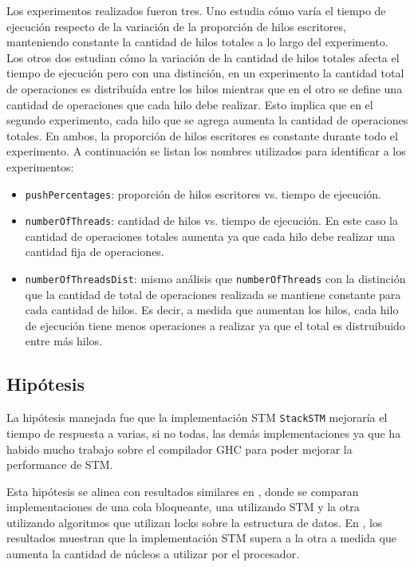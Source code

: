 Los experimentos realizados fueron tres.
Uno estudia cómo varía el tiempo de ejecución respecto de la variación de la proporción de hilos escritores, manteniendo constante la cantidad de hilos totales a lo largo del experimento.
Los otros dos estudian cómo la variación de la cantidad de hilos totales afecta el tiempo de ejecución pero con una distinción, en un experimento la cantidad total de operaciones es distribuída entre los hilos mientras que en el otro se define una cantidad de operaciones que cada hilo debe realizar. Esto implica que en el segundo experimento, cada hilo que se agrega aumenta la cantidad de operaciones totales. En ambos, la proporción de hilos escritores es constante durante todo el experimento.
A continuación se listan los nombres utilizados para identificar a los experimentos:

\begin{itemize}
    \item \texttt{pushPercentages}: proporción de hilos escritores vs. tiempo de ejecución.
    \item \texttt{numberOfThreads}: cantidad de hilos vs. tiempo de ejecución. En este caso la cantidad de operaciones totales aumenta ya que cada hilo debe realizar una cantidad fija de operaciones.
    \item \texttt{numberOfThreadsDist}: mismo análisis que \texttt{numberOfThreads} con la distinción que la cantidad de total de operaciones realizada se mantiene constante para cada cantidad de hilos. Es decir, a medida que aumentan los hilos, cada hilo de ejecución tiene menos operaciones a realizar ya que el total es distruibuido entre más hilos.
\end{itemize}

\subsection{Hipótesis}\label{subsec:hypothesis}
La hipótesis manejada fue que la implementación STM \texttt{StackSTM} mejoraría el tiempo de respuesta a varias, si no todas, las demás implementaciones ya que ha habido mucho trabajo sobre el compilador GHC para poder mejorar la performance de STM.

Esta hipótesis se alinea con resultados similares en \cite{abq}, donde se comparan implementaciones de una cola bloqueante, una utilizando STM y la otra utilizando algoritmos que utilizan locks sobre la estructura de datos.
En \cite{abq}, los resultados muestran que la implementación STM supera a la otra a medida que aumenta la cantidad de núcleos a utilizar por el procesador.

